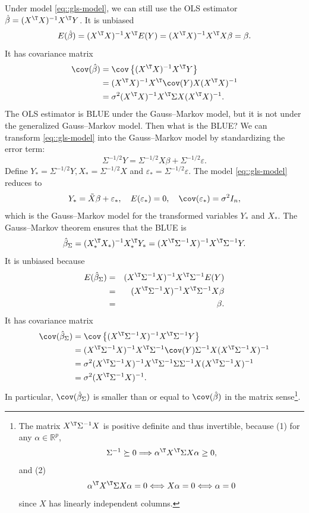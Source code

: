 Under model \eqref{eq::gls-model}, we can still use the OLS estimator $\hat{\beta}=(X^{\T}X)^{-1}X^{\T}Y$. It is unbiased 
$$
E(\hat{\beta}) = (X^{\T}X)^{-1}X^{\T}E(Y) = (X^{\T}X)^{-1}X^{\T} X\beta = \beta . 
$$
It has covariance matrix
\begin{align}
\cov(\hat{\beta}) & =\cov\left\{ (X^{\T}X)^{-1}X^{\T}Y\right\} \nonumber \\
 & =(X^{\T}X)^{-1}X^{\T}\cov(Y)X(X^{\T}X)^{-1}\nonumber \\
 & =\sigma^{2}(X^{\T}X)^{-1}X^{\T}\Sigma X(X^{\T}X)^{-1}.\label{eq:cov-ols-generalmodel}
\end{align}
The OLS estimator is BLUE under the Gauss--Markov model, but it is
not under the generalized Gauss--Markov model. Then what is the BLUE? We can transform \eqref{eq::gls-model} into the Gauss--Markov model by standardizing the error
term: 
\[
\Sigma^{-1/2}Y=\Sigma^{-1/2}X\beta+\Sigma^{-1/2}\varepsilon.
\]
Define $Y_* =\Sigma^{-1/2}Y, X_*=\Sigma^{-1/2}X$ and $ \varepsilon_* =\Sigma^{-1/2}\varepsilon$.
The model \eqref{eq::gls-model} reduces to 
\[
Y_* =\tilde{X}\beta+ \varepsilon_*,\quad E(\varepsilon_*) = 0, \quad \cov(\varepsilon_*) = \sigma^{2}I_{n},
\]
which is the Gauss--Markov model for the transformed variables  $Y_*$ and $X_*$. 
The Gauss--Markov theorem ensures that the BLUE is
\[
\hat{\beta}_{\Sigma}=({X}_*^{\T}{X}_*)^{-1}{X}_*^{\T}{Y}_*=(X^{\T}\Sigma^{-1}X)^{-1}X^{\T}\Sigma^{-1}Y . 
\]
It is unbiased because
\begin{eqnarray*}
E(\hat{\beta}_{\Sigma}) 
&=& (X^{\T}\Sigma^{-1}X)^{-1}X^{\T}\Sigma^{-1}E(Y) \\
&=& (X^{\T}\Sigma^{-1}X)^{-1}X^{\T}\Sigma^{-1}X\beta \\
&=&\beta . 
\end{eqnarray*}
It has covariance matrix
\begin{align}
\cov(\hat{\beta}_{\Sigma}) & =\cov\left\{ (X^{\T}\Sigma^{-1}X)^{-1}X^{\T}\Sigma^{-1}Y\right\} \nonumber \\
 & =(X^{\T}\Sigma^{-1}X)^{-1}X^{\T}\Sigma^{-1}\cov(Y)\Sigma^{-1}X(X^{\T}\Sigma^{-1}X)^{-1}\nonumber \\
 & =\sigma^{2}(X^{\T}\Sigma^{-1}X)^{-1}X^{\T}\Sigma^{-1}\Sigma\Sigma^{-1}X(X^{\T}\Sigma^{-1}X)^{-1}\nonumber \\
 & =\sigma^{2}(X^{\T}\Sigma^{-1}X)^{-1}.\label{eq:cov-wls-generalmodel}
\end{align}
In particular, $\cov(\hat{\beta}_{\Sigma})$ is
smaller than or equal to $\cov(\hat{\beta})$ in the matrix sense\footnote{The matrix $X^{\T}\Sigma^{-1} X$ is positive definite and thus invertible,
because (1) for any $\alpha\in\mathbb{R}^{p}$, 
\[
\Sigma^{-1} \succeq0\Longrightarrow\alpha^{\T}X^{\T}\Sigma X\alpha\geq0,
\]
and (2) 
$$
\alpha^{\T}X^{\T}\Sigma X\alpha  =0\Longleftrightarrow X\alpha=0
  \Longleftrightarrow\alpha=0
$$
since $X$ has linearly independent columns. }. 
